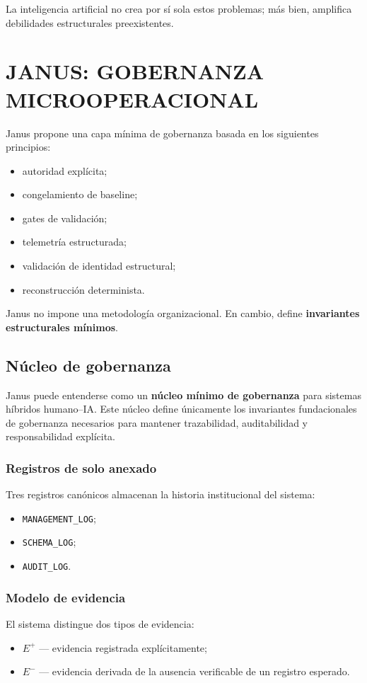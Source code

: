 \documentclass[conference]{IEEEtran}
\begin{document}
La inteligencia artificial no crea por sí sola estos problemas; más bien, amplifica debilidades estructurales preexistentes.

\section{JANUS: GOBERNANZA MICROOPERACIONAL}
Janus propone una capa mínima de gobernanza basada en los siguientes principios:
\begin{itemize}
  \item autoridad explícita;
  \item congelamiento de baseline;
  \item gates de validación;
  \item telemetría estructurada;
  \item validación de identidad estructural;
  \item reconstrucción determinista.
\end{itemize}

Janus no impone una metodología organizacional. En cambio, define \textbf{invariantes estructurales mínimos}.

\subsection{Núcleo de gobernanza}
Janus puede entenderse como un \textbf{núcleo mínimo de gobernanza} para sistemas híbridos humano--IA. Este núcleo define únicamente los invariantes fundacionales de gobernanza necesarios para mantener trazabilidad, auditabilidad y responsabilidad explícita.

\subsubsection{Registros de solo anexado}
Tres registros canónicos almacenan la historia institucional del sistema:
\begin{itemize}
  \item \texttt{MANAGEMENT\_LOG};
  \item \texttt{SCHEMA\_LOG};
  \item \texttt{AUDIT\_LOG}.
\end{itemize}

\subsubsection{Modelo de evidencia}
El sistema distingue dos tipos de evidencia:
\begin{itemize}
  \item \textbf{$E^{+}$} --- evidencia registrada explícitamente;
  \item \textbf{$E^{-}$} --- evidencia derivada de la ausencia verificable de un registro esperado.
\end{itemize}
\end{document}
